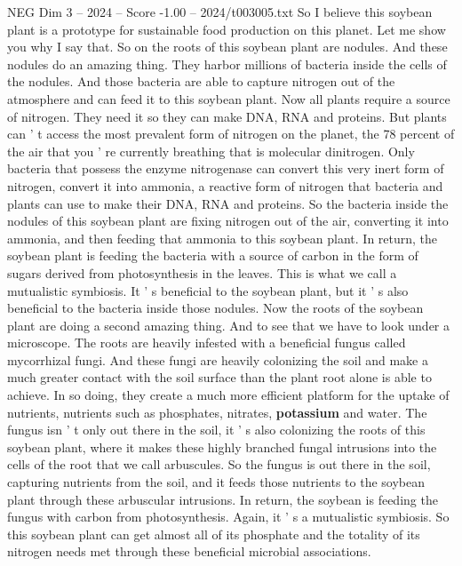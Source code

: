 \begin{textsample}{NEG Dim 3 – 2024 – Score -1.00 – 2024/t003005.txt}  \label{ex:f3_neg_060}
So I believe this soybean plant is a prototype for sustainable food production on this planet.
Let me show you why I say that.
So on the roots of this soybean plant are nodules.
And these nodules do an amazing thing.
They harbor millions of bacteria inside the cells of the nodules.
And those bacteria are able to capture nitrogen out of the atmosphere and can feed it to this soybean plant.
Now all plants require a source of nitrogen.
They need it so they can make DNA, RNA and proteins.
But plants can ' t access the most prevalent form of nitrogen on the planet, the 78 percent of the air that you ' re currently breathing that is molecular dinitrogen.
Only bacteria that possess the enzyme nitrogenase can convert this very inert form of nitrogen, convert it into ammonia, a reactive form of nitrogen that bacteria and plants can use to make their DNA, RNA and proteins.
So the bacteria inside the nodules of this soybean plant are fixing nitrogen out of the air, converting it into ammonia, and then feeding that ammonia to this soybean plant.
In return, the soybean plant is feeding the bacteria with a source of carbon in the form of sugars derived from photosynthesis in the leaves.
This is what we call a mutualistic symbiosis.
It ' s beneficial to the soybean plant, but it ' s also beneficial to the bacteria inside those nodules.
Now the roots of the soybean plant are doing a second amazing thing.
And to see that we have to look under a microscope.
The roots are heavily infested with a beneficial fungus called mycorrhizal fungi.
And these fungi are heavily colonizing the soil and make a much greater contact with the soil surface than the plant root alone is able to achieve.
In so doing, they create a much more efficient platform for the uptake of nutrients, nutrients such as phosphates, nitrates, \textbf{potassium} and water.
The fungus isn ' t only out there in the soil, it ' s also colonizing the roots of this soybean plant, where it makes these highly branched fungal intrusions into the cells of the root that we call arbuscules.
So the fungus is out there in the soil, capturing nutrients from the soil, and it feeds those nutrients to the soybean plant through these arbuscular intrusions.
In return, the soybean is feeding the fungus with carbon from photosynthesis.
Again, it ' s a mutualistic symbiosis.
So this soybean plant can get almost all of its phosphate and the totality of its nitrogen needs met through these beneficial microbial associations.

\end{textsample}
